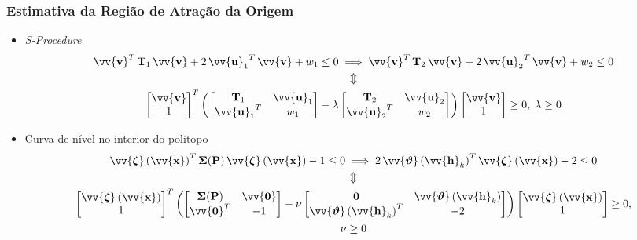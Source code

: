 \documentclass{beamer}
\newcommand*{\Round}[1]{\left(#1\right)}
\newcommand*{\Prod}{\,}
\newcommand*{\Bold}[1]{\boldsymbol{\mathbf{#1}}}
\newcommand*{\Matr}[1]{\Bold{#1}}
\newcommand*{\Vect}[1]{\vv{\Bold{#1}}}
\newcommand*{\Transp}[1]{{#1}^{T}}
\newcommand*{\Viff}{\\\Updownarrow\\}
\renewcommand{\Prod}{\,}
\begin{document}
\begin{frame}\frametitle{Estimativa da Região de Atração da Origem}
  \begin{itemize}
    \item \textit{S-Procedure}
    \small
    \begin{gather}
      \Transp{\Vect{v}} \Prod \Matr{T}_1 \Prod \Vect{v} + 2 \Prod \Transp{\Vect{u}_1} \Prod \Vect{v} + w_1 \leq 0
      \implies
      \Transp{\Vect{v}} \Prod \Matr{T}_2 \Prod \Vect{v} + 2 \Prod \Transp{\Vect{u}_2} \Prod \Vect{v} + w_2 \leq 0
      \Viff
      \Transp{\begin{bmatrix} \Vect{v} \\ 1 \end{bmatrix}} \Round{\begin{bmatrix} \Matr{T}_1 & \Vect{u}_1 \\ \Transp{\Vect{u}_1} & w_1 \end{bmatrix} - \lambda \begin{bmatrix} \Matr{T}_2 & \Vect{u}_2 \\ \Transp{\Vect{u}_2} & w_2 \end{bmatrix}} \begin{bmatrix} \Vect{v} \\ 1 \end{bmatrix} \geq 0
      ,\; \lambda \geq 0
    \end{gather}
    \normalsize
    \item Curva de nível no interior do politopo
    \small
    \begin{gather}
      \Transp{\Vect{\zeta}\Round{\Vect{x}}} \Prod \Matr{\Sigma}(\Matr{P}) \Prod \Vect{\zeta}\Round{\Vect{x}} -1 \leq 0
      \implies
      2 \Prod \Transp{\Vect{\vartheta}\Round{\Vect{h}_k}} \Prod \Vect{\zeta}\Round{\Vect{x}} - 2 \leq 0
      \Viff
      \Transp{\begin{bmatrix} \Vect{\zeta}\Round{\Vect{x}} \\ 1 \end{bmatrix}} \Round{\begin{bmatrix} \Matr{\Sigma}(\Matr{P}) & \Vect{0} \\ \Transp{\Vect{0}} & -1 \end{bmatrix} - \nu \begin{bmatrix} \Matr{0} & \Vect{\vartheta}\Round{\Vect{h}_k} \\ \Transp{\Vect{\vartheta}\Round{\Vect{h}_k}} & -2 \end{bmatrix}} \begin{bmatrix} \Vect{\zeta}\Round{\Vect{x}} \\ 1 \end{bmatrix} \geq 0
      ,\\ \nu \geq 0
    \end{gather}
    \normalsize
  \end{itemize}
\end{frame}
\end{document}
